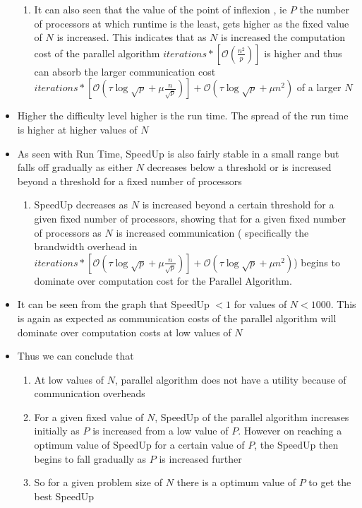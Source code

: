 \documentclass[twoside,11pt]{article}\usepackage{amsmath,amsfonts,amsthm,fullpage}
\begin{document}
\begin{itemize}
\begin{enumerate}
\item
It can also seen that the value of the point of inflexion , ie $P$ the number of processors at which runtime is the least, gets higher as the fixed value of $N$ is increased. This indicates that as $N$ is increased the computation cost of the parallel algorithm $iterations*[\mathcal{O}(\frac{n^2}{p})]$ is higher and thus can absorb the larger communication cost $iterations*[\mathcal{O}(\tau \log \sqrt{p} + \mu \frac{n}{\sqrt{p}})] + \mathcal{O}(\tau \log \sqrt{p} + \mu n^2)$ of a larger $N$
\end{enumerate}
\item
Higher the difficulty level higher is the run time. The spread of the run time is higher at higher values of $N$
\item
As seen with Run Time, SpeedUp is also fairly stable in a small range but falls off gradually as either $N$ decreases below a threshold or is increased beyond a threshold for a fixed number of processors
\begin{enumerate}
\item
SpeedUp decreases as $N$ is increased beyond a certain threshold for a given fixed number of processors, showing that for a given fixed number of processors as $N$ is increased communication ( specifically the brandwidth overhead in  $iterations*[\mathcal{O}(\tau \log \sqrt{p} + \mu \frac{n}{\sqrt{p}})] + \mathcal{O}(\tau \log \sqrt{p} + \mu n^2)$) begins to dominate over computation cost for the Parallel Algorithm.
\end{enumerate}
\item
It can be seen from the graph that SpeedUp $<1$ for values of $N < 1000 $. This is again as expected as communication costs of the parallel algorithm will dominate over computation costs at low values of $N$
\item
Thus we can conclude that
\begin{enumerate}
\item
At low values of $N$, parallel algorithm does not have a utility because of communication overheads
\item
For a given fixed value of $N$, SpeedUp of the parallel algorithm increases initially as $P$ is increased from a low value of $P$. However on reaching a optimum value of SpeedUp for a certain value of $P$, the SpeedUp then begins to fall gradually as $P$ is increased further
\item
So for a given problem size of $N$ there is a optimum value of $P$ to get the best SpeedUp
\end{enumerate}
\end{itemize}




\end{document}
